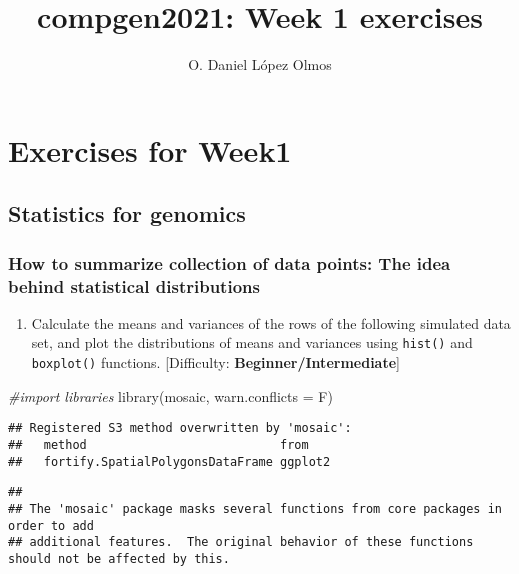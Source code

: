 \documentclass[
]{article}
\title{compgen2021: Week 1 exercises}
\author{O. Daniel López Olmos}
\date{}
\newenvironment{Shaded}{\begin{snugshade}}{\end{snugshade}}
\newcommand{\AttributeTok}[1]{\textcolor[rgb]{0.77,0.63,0.00}{#1}}
\newcommand{\CommentTok}[1]{\textcolor[rgb]{0.56,0.35,0.01}{\textit{#1}}}
\newcommand{\FunctionTok}[1]{\textcolor[rgb]{0.00,0.00,0.00}{#1}}
\newcommand{\NormalTok}[1]{#1}
\providecommand{\tightlist}{%
  \setlength{\itemsep}{0pt}\setlength{\parskip}{0pt}}
\begin{document}
\maketitle

\hypertarget{exercises-for-week1}{%
\section{Exercises for Week1}\label{exercises-for-week1}}

\hypertarget{statistics-for-genomics}{%
\subsection{Statistics for genomics}\label{statistics-for-genomics}}

\hypertarget{how-to-summarize-collection-of-data-points-the-idea-behind-statistical-distributions}{%
\subsubsection{How to summarize collection of data points: The idea
behind statistical
distributions}\label{how-to-summarize-collection-of-data-points-the-idea-behind-statistical-distributions}}

\begin{enumerate}
\def\labelenumi{\arabic{enumi}.}
\tightlist
\item
  Calculate the means and variances of the rows of the following
  simulated data set, and plot the distributions of means and variances
  using \texttt{hist()} and \texttt{boxplot()} functions. {[}Difficulty:
  \textbf{Beginner/Intermediate}{]}
\end{enumerate}

\begin{Shaded}
\begin{Highlighting}[]
\CommentTok{\#import libraries}
\FunctionTok{library}\NormalTok{(mosaic, }\AttributeTok{warn.conflicts =}\NormalTok{ F)}
\end{Highlighting}
\end{Shaded}

\begin{verbatim}
## Registered S3 method overwritten by 'mosaic':
##   method                           from   
##   fortify.SpatialPolygonsDataFrame ggplot2
\end{verbatim}

\begin{verbatim}
## 
## The 'mosaic' package masks several functions from core packages in order to add 
## additional features.  The original behavior of these functions should not be affected by this.
\end{verbatim}
\end{document}
